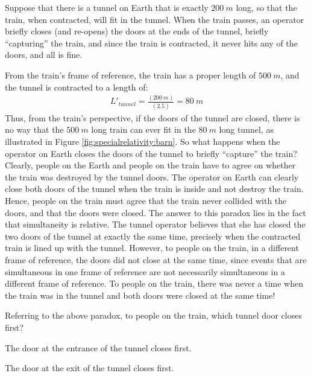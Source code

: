 Suppose that there is a tunnel on Earth that is exactly $\SI{200}{m}$ long, so that the train, when contracted, will fit in the tunnel. When the train passes, an operator briefly closes (and re-opens) the doors at the ends of the tunnel, briefly ``capturing'' the train, and since the train is contracted, it never hits any of the doors, and all is fine.

From the train's frame of reference, the train has a proper length of $\SI{500}{m}$, and the tunnel is contracted to a length of:
\begin{align*}
L'_{tunnel}=\frac{(\SI{200}{m})}{(2.5)}=\SI{80}{m}
\end{align*}
Thus, from the train's perspective, if the doors of the tunnel are closed, there is no way that the $\SI{500}{m}$ long train can ever fit in the $\SI{80}{m}$ long tunnel, as illustrated in Figure \ref{fig:specialrelativity:barn}. So what happens when the operator on Earth closes the doors of the tunnel to briefly ``capture'' the train? 
Clearly, people on the Earth and people on the train have to agree on whether the train was destroyed by the tunnel doors. The operator on Earth can clearly close both doors of the tunnel when the train is inside and not destroy the train. Hence, people on the train must agree that the train never collided with the doors, and that the doors were closed. The answer to this paradox lies in the fact that simultaneity is relative. The tunnel operator believes that she has closed the two doors of the tunnel at exactly the same time, precisely when the contracted train is lined up with the tunnel. However, to people on the train, in a different frame of reference, the doors did not close at the same time, since events that are simultaneous in one frame of reference are not necessarily simultaneous in a different frame of reference. To people on the train, there was never a time when the train was in the tunnel and both doors were closed at the same time!
\begin{checkpoint}{}
	\begin{MCquestion}{Referring to the above paradox, to people on the train, which tunnel door closes first?}
		\item The door at the entrance of the tunnel closes first. 
		\item The door at the exit of the tunnel closes first. \correct
	\end{MCquestion}
\end{checkpoint}
